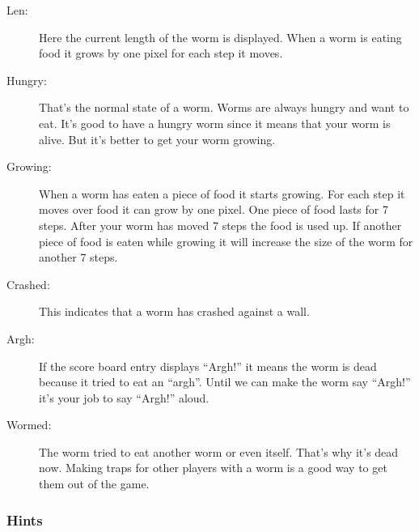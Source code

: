 \begin{description}
\item[Len:]
Here the current length of the worm is displayed. When a worm is eating
food it grows by one pixel for each step it moves. 

\item[Hungry:]
That's the normal state of a worm. Worms are always
hungry and want to eat. It's good to have a hungry
worm since it means that your worm is alive. But it's
better to get your worm growing. 

\item[Growing:]
When a worm has eaten a piece of food it starts growing. For each step
it moves over food it can grow by one pixel. One piece of food lasts
for 7 steps. After your worm has moved 7 steps the food is used up. If
another piece of food is eaten while growing it will increase the size
of the worm for another 7 steps. 

\item[Crashed:]
This indicates that a worm has crashed against a wall.

\item[Argh:]
If the score board entry displays ``Argh!'' it
means the worm is dead because it tried to eat an ``argh''. Until we
can make the worm say ``Argh!'' it's your job to say ``Argh!'' aloud.

\item[Wormed:]
The worm tried to eat another worm or even itself.
That's why it's dead now.  Making traps for other players with a worm
is a good way to get them out of the game.
\end{description}

\subsubsection{Hints}

